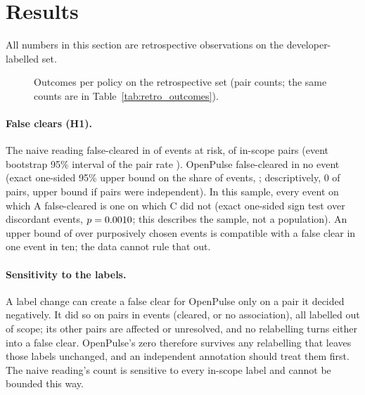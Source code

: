 \documentclass[11pt]{article}
\begin{document}
\section{Results}
\label{sec:results}

All numbers in this section are retrospective observations on the
developer-labelled set.



\begin{figure}[t]
\centering
\resizebox{\linewidth}{!}{}
\caption{Outcomes per policy on the retrospective set (pair counts; the same
counts are in Table~\ref{tab:retro_outcomes}).}
\label{fig:outcomes}
\end{figure}

\paragraph{False clears (H1).} The naive reading false-cleared in
\FCaEvents{} of \EventsAtRisk{} events at risk, \FCa{} of \RetroInScope{}
in-scope pairs (event bootstrap 95\% interval of the pair rate \FCaBoot{}).
OpenPulse false-cleared in no event (exact one-sided 95\% upper bound on the
share of events, \FCcEventUpper{}; descriptively, 0 of \RetroInScope{} pairs,
upper bound \FCcUpper{} if pairs were independent). In this sample, every
event on which A false-cleared is one on which C did not (exact one-sided sign
test over discordant events, $p=0.0010{}$; this describes the sample, not a
population). An upper bound of \FCcEventUpper{} over \EventsAtRisk{}
purposively chosen events is compatible with a false clear in one event in
ten; the data cannot rule that out.

\paragraph{Sensitivity to the labels.} A label change can create a false clear
for OpenPulse only on a pair it decided negatively. It did so on \NegC{} pairs
in \NegCEvents{} events (cleared, or no association), all labelled out of
scope; its other \NegCOther{} pairs are affected or unresolved, and no
relabelling turns either into a false clear. OpenPulse's zero therefore
survives any relabelling that leaves those \NegC{} labels unchanged, and an
independent annotation should treat them first. The naive reading's count is
sensitive to every in-scope label and cannot be bounded this way.
\end{document}
